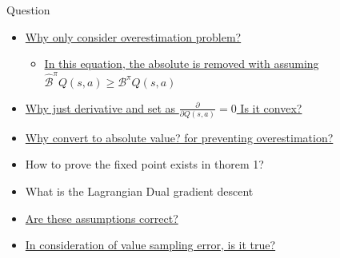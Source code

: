 \documentclass[11pt]{beamer}
\newcommand{\mc}[1]{\mathcal{#1}}
\begin{document}
\begin{frame}{Question}
  \begin{itemize}
    \item \hyperlink{text:why_only_consider_overestimation}{Why only consider overestimation problem?}
    \begin{itemize}
      \item \hyperlink{text:why_assume_overestimation}{In this equation, the absolute is removed with assuming $\hat{\mc{B}}^\pi Q(s,a) \geq \mc{B}^\pi Q(s,a)$}
    \end{itemize}
    \item \hyperlink{thm:1_derivative}{Why just derivative and set as $\frac{\partial}{\partial Q(s,a)} = 0$ Is it convex?}
    \item \hyperlink{thm:2_absolute}{Why convert to absolute value? for preventing overestimation?}
    \item How to prove the fixed point exists in thorem 1?
    \item What is the Lagrangian Dual gradient descent
    \item \hyperlink{thm:3_3_assumption}{Are these assumptions correct?}
    \item \hyperlink{thm:sampling_error_value_version}{In consideration of value sampling error, is it true?}
  \end{itemize}
\end{frame}
\end{document}
